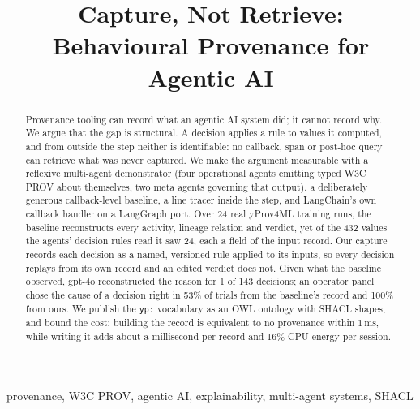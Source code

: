 \documentclass[conference]{IEEEtran}
\begin{document}
\title{Capture, Not Retrieve:\\ Behavioural Provenance for Agentic AI}

\author{
\and
{}
}

\maketitle

\begin{abstract}
Provenance tooling can record what an agentic AI system did; it cannot record why. We argue
that the gap is structural. A decision applies a rule to values it computed, and from outside
the step neither is identifiable: no callback, span or post-hoc query can retrieve what was
never captured. We make the argument measurable with a reflexive multi-agent demonstrator
(four operational agents emitting typed W3C PROV about themselves, two meta agents governing
that output), a deliberately generous callback-level baseline, a line tracer inside the step,
and LangChain's own callback handler on a LangGraph port. Over 24 real yProv4ML training runs,
the baseline reconstructs every activity, lineage relation and verdict, yet of the 432 values
the agents' decision rules read it saw 24, each a field of the input record. Our capture
records each decision as a named, versioned rule applied to its inputs, so every decision
replays from its own record and an edited verdict does not. Given what the baseline
observed, gpt-4o reconstructed the reason for 1 of 143 decisions; an operator panel chose
the cause of a decision right in
53\% of trials from the baseline's record and 100\% from ours. We publish the \texttt{yp:}
vocabulary as an OWL ontology with SHACL shapes, and bound the cost: building the record is
equivalent to no provenance within 1\,ms, while writing it adds about a millisecond per
record and 16\% CPU energy per session.
\end{abstract}

\begin{IEEEkeywords}
provenance, W3C PROV, agentic AI, explainability, multi-agent systems, SHACL
\end{IEEEkeywords}
\end{document}
